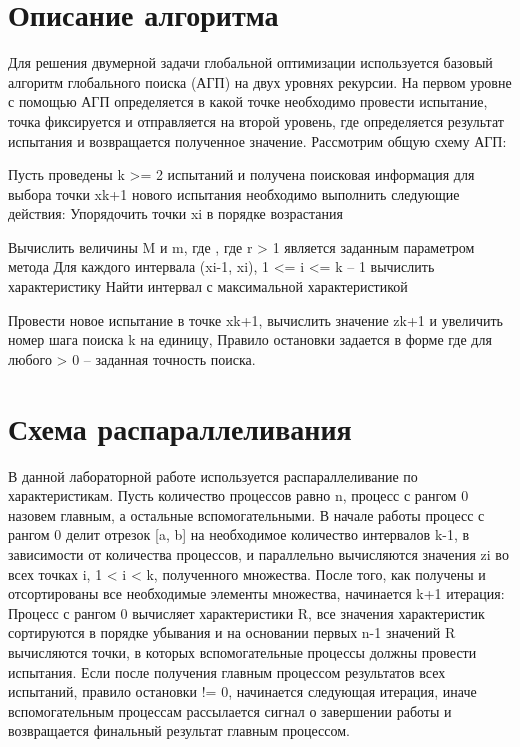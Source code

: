 \documentclass{report}
\begin{document}
\section*{Описание алгоритма}
Для решения двумерной задачи глобальной оптимизации используется базовый алгоритм глобального поиска (АГП) на двух уровнях рекурсии. На первом уровне с помощью АГП определяется в какой точке необходимо провести испытание, точка фиксируется и отправляется на второй уровень, где определяется результат испытания и возвращается полученное значение.
Рассмотрим общую схему АГП:
\par
Пусть проведены k >= 2 испытаний и получена поисковая информация
для выбора точки xk+1 нового испытания необходимо
выполнить следующие действия:
Упорядочить точки xi в порядке возрастания
\par
Вычислить величины M и m, где   , где r > 1 является заданным параметром метода
Для каждого интервала (xi-1, xi), 1 <= i <= k – 1 вычислить характеристику
Найти интервал с максимальной характеристикой
\par
Провести новое испытание в точке xk+1, вычислить значение zk+1 и увеличить номер шага поиска k на единицу,	
Правило остановки задается в форме
где для любого > 0 – заданная точность поиска.

\newpage

\section*{Схема распараллеливания}
В данной лабораторной работе используется распараллеливание по характеристикам. Пусть количество процессов равно n, процесс с рангом 0 назовем главным, а остальные вспомогательными. В начале работы процесс с рангом 0 делит отрезок [a, b] на необходимое количество интервалов k-1, в зависимости от количества процессов, и параллельно вычисляются значения zi во всех точках i, 1 < i < k, полученного множества. После того, как получены и отсортированы все необходимые элементы множества, начинается k+1 итерация: Процесс с рангом 0 вычисляет характеристики R, все значения характеристик сортируются в порядке убывания и на основании первых n-1 значений R вычисляются точки, в которых вспомогательные процессы должны провести испытания. Если после получения главным процессом результатов всех испытаний, правило остановки != 0, начинается следующая итерация, иначе вспомогательным процессам рассылается сигнал о завершении работы и возвращается финальный результат главным процессом.
\newpage
\end{document}
